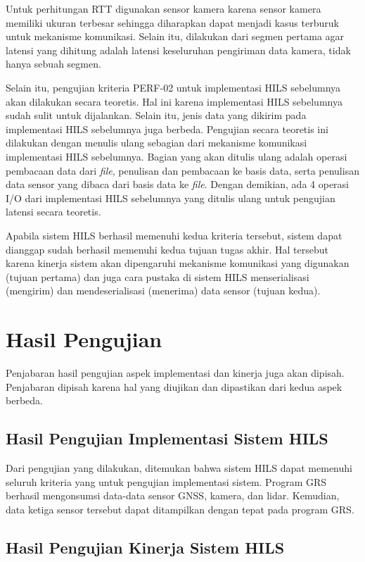Untuk perhitungan RTT digunakan sensor kamera karena sensor kamera memiliki
ukuran terbesar sehingga diharapkan dapat menjadi kasus terburuk untuk mekanisme
komunikasi. Selain itu, dilakukan dari segmen pertama agar latensi yang dihitung
adalah latensi keseluruhan pengiriman data kamera, tidak hanya sebuah segmen.

Selain itu, pengujian kriteria PERF-02 untuk implementasi HILS sebelumnya akan
dilakukan secara teoretis. Hal ini karena implementasi HILS sebelumnya sudah
sulit untuk dijalankan. Selain itu, jenis data yang dikirim pada implementasi
HILS sebelumnya juga berbeda. Pengujian secara teoretis ini dilakukan dengan
menulis ulang sebagian dari mekanisme komunikasi implementasi HILS sebelumnya.
Bagian yang akan ditulis ulang adalah operasi pembacaan data dari \textit{file},
penulisan dan pembacaan ke basis data, serta penulisan data sensor yang dibaca
dari basis data ke \textit{file}. Dengan demikian, ada 4 operasi I/O dari
implementasi HILS sebelumnya yang ditulis ulang untuk pengujian latensi secara
teoretis.

Apabila sistem HILS berhasil memenuhi kedua kriteria tersebut, sistem dapat
dianggap sudah berhasil memenuhi kedua tujuan tugas akhir. Hal tersebut karena
kinerja sistem akan dipengaruhi mekanisme komunikasi yang digunakan (tujuan
pertama) dan juga cara pustaka di sistem HILS menserialisasi (mengirim) dan
mendeserialisasi (menerima) data sensor (tujuan kedua).

\section{Hasil Pengujian}

Penjabaran hasil pengujian aspek implementasi dan kinerja juga akan dipisah.
Penjabaran dipisah karena hal yang diujikan dan dipastikan dari kedua aspek
berbeda.

\subsection{Hasil Pengujian Implementasi Sistem HILS}

Dari pengujian yang dilakukan, ditemukan bahwa sistem HILS dapat memenuhi
seluruh kriteria yang untuk pengujian implementasi sistem. Program GRS berhasil
mengonsumsi data-data sensor GNSS, kamera, dan lidar. Kemudian, data ketiga
sensor tersebut dapat ditampilkan dengan tepat pada program GRS.

\subsection{Hasil Pengujian Kinerja Sistem HILS}

